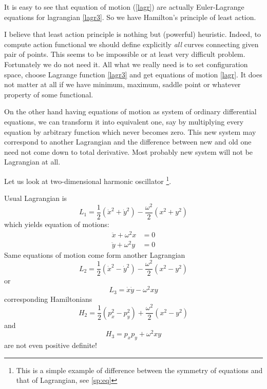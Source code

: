 It is easy to see that equation of motion (\ref{lagr}) are actually  Euler-Lagrange equations 
for lagrangian \eqref{lagr3}. 
So we have  Hamilton's principle of least action.


I believe that least action principle  is nothing but (powerful) heuristic. Indeed, to compute 
action functional we should define explicitly {\em all} curves connecting given pair of points.
This seems to be impossible or at least very difficult problem. Fortunately we do not need it.
All what we really need is to set configuration space, choose Lagrange function 
\eqref{lagr3} and get equations of motion \eqref{lagr}. It does not matter at all
if we have minimum, maximum, saddle point or whatever property of some functional.

On the other hand having equations of motion as system of ordinary differential equations,
we can transform it into equivalent one, say by multiplying every equation by arbitrary 
function which never becomes zero. This new system may correspond to another Lagrangian and
the difference between new and old one need not come down to total derivative. Most probably
new system will not be Lagrangian at all.

Let us look at two-dimensional harmonic oscillator
\footnote{This is a simple example of difference between the
symmetry of equations and that of Lagrangian, see \ref{sp:eq} }.

Usual Lagrangian is
\begin{equation}
   \label {ho1}
    L_1= \frac{1}{2} (\dot x^2+\dot y^2) -\frac{ \omega^2}{2} ( x^2+ y^2)
\end{equation}
which yields equation  of motions:
\begin{equation}
   \label {hoe1}
   \begin{split}
       \ddot x+ \omega^2 x & =0 \\
       \ddot y+ \omega^2 y & =0 
   \end{split}
\end{equation}
Same equations of motion come form 
another Lagrangian
\begin{equation}
   \label {ho2}
    L_2= \frac{1}{2} (\dot x^2-\dot y^2) -\frac{ \omega^2}{2} ( x^2- y^2)
\end{equation}
or
\begin{equation}
   \label {ho3}
    L_3= \dot x\dot y - \omega^2  x y
\end{equation}
corresponding  Hamiltonians 
\begin{equation}
   \label {ho2h}
    H_2= \frac{1}{2} ( p_x^2-p_y^2) +\frac{ \omega^2}{2} ( x^2- y^2)
\end{equation}
and
\begin{equation}
   \label {ho3h}
    H_3= p_x p_y +\omega^2  x y
\end{equation}
are not even positive definite!


